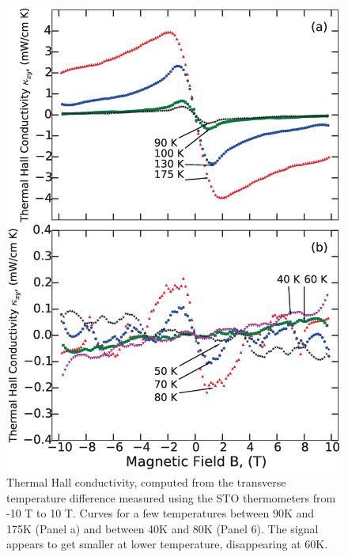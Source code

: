 \documentclass{thesis-umich}
\begin{document}
\begin{figure} \centering \caption[Thermal Hall conductivity of bismuth]{Thermal Hall conductivity, computed from the
    transverse temperature difference measured using the STO thermometers from
    -10 T to 10 T. Curves for a few temperatures between 90K and 175K (Panel a)
    and between 40K and 80K (Panel 6). The signal appears to get smaller at
lower temperature, disappearing at 60K.} \label{fig:kappaxy}
\includegraphics[width=\columnwidth]{figures/kappaxy_apl.eps} \end{figure}
\end{document}
